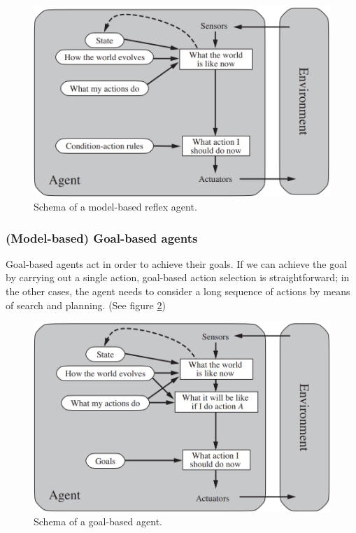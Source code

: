\begin{figure}[hbt]
    \centering
    \includegraphics[scale=0.35]{Images/Chapter 1/model-based-reflex-agent.png}
    \caption{Schema of a model-based reflex agent.}
    \label{fig:ch1-modelbasedreflexagent}
\end{figure}

\subsubsection{(Model-based) Goal-based agents}
Goal-based agents act in order to achieve their goals. If we can achieve the goal by carrying out a single action, goal-based action selection is straightforward; in the other cases, the agent needs to consider a long sequence of actions by means of search and planning. (See figure \ref{fig:ch1-goalbasedagent})

\begin{figure}[hbt]
    \centering
    \includegraphics[scale=0.35]{Images/Chapter 1/goal-based-agent.png}
    \caption{Schema of a goal-based agent.}
    \label{fig:ch1-goalbasedagent}
\end{figure}

